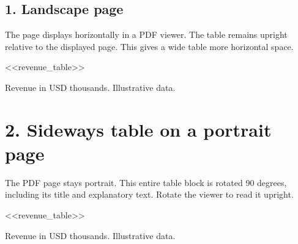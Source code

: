 \documentclass[11pt]{article}
\begin{document}
\begin{landscape}
\section*{1. Landscape page}
The page displays horizontally in a PDF viewer. The table remains upright
relative to the displayed page. This gives a wide table more horizontal space.
\begin{center}
\small <<revenue_table>>
\end{center}
Revenue in USD thousands. Illustrative data.
\end{landscape}

\begin{table}
\centering
\begin{minipage}{\textheight}
\section*{2. Sideways table on a portrait page}
The PDF page stays portrait. This entire table block is rotated 90 degrees,
including its title and explanatory text. Rotate the viewer to read it upright.
\begin{center}
\small <<revenue_table>>
\end{center}
Revenue in USD thousands. Illustrative data.
\end{minipage}
\end{table}
\end{document}
